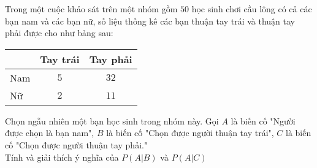 \begin{bt}
	Trong một cuộc khảo sát trên một nhóm gồm $50$ học sinh chơi cầu lông có cả các bạn nam và các bạn nữ, số liệu thống kê các bạn thuận tay trái và thuận tay phải được cho như bảng sau:
	\begin{center}
	\begin{tabular}{|l|c|c|}
	\hline
	\diagbox{Giới tính}{Tay thuận}& Tay trái & Tay phải\\\hline
	Nam& $5$ & $32$\\\hline
	Nữ & $2$ & $11$\\\hline
	\end{tabular}
	\end{center}
	Chọn ngẫu nhiên một bạn học sinh trong nhóm này. Gọi $A$ là biến cố "Người được chọn là bạn nam", $B$ là biến cố "Chọn được người thuận tay trái", $C$ là biến cố "Chọn được người thuận tay phải."\\
	Tính và giải thích ý nghĩa của $P(A|B)$ và $P(A|C)$
\end{bt}

